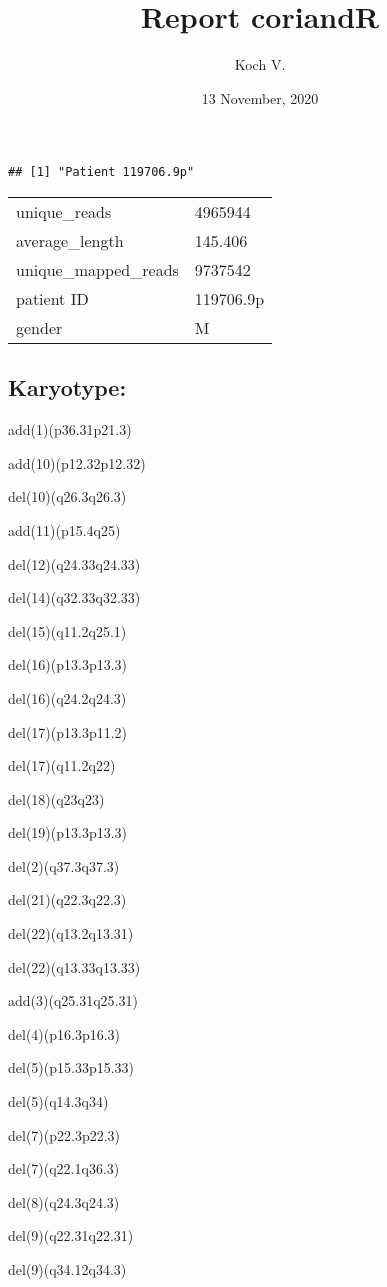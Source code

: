 \documentclass[]{article}
\title{Report coriandR}
\author{Koch V.}
\date{13 November, 2020}
\begin{document}
\maketitle

\begin{verbatim}
## [1] "Patient 119706.9p"
\end{verbatim}

\begin{longtable}[]{@{}ll@{}}
\toprule
\endhead
unique\_reads & 4965944\tabularnewline
average\_length & 145.406\tabularnewline
unique\_mapped\_reads & 9737542\tabularnewline
patient ID & 119706.9p\tabularnewline
gender & M\tabularnewline
\bottomrule
\end{longtable}

\hypertarget{karyotype}{%
\subsection{Karyotype:}\label{karyotype}}

add(1)(p36.31p21.3)

add(10)(p12.32p12.32)

del(10)(q26.3q26.3)

add(11)(p15.4q25)

del(12)(q24.33q24.33)

del(14)(q32.33q32.33)

del(15)(q11.2q25.1)

del(16)(p13.3p13.3)

del(16)(q24.2q24.3)

del(17)(p13.3p11.2)

del(17)(q11.2q22)

del(18)(q23q23)

del(19)(p13.3p13.3)

del(2)(q37.3q37.3)

del(21)(q22.3q22.3)

del(22)(q13.2q13.31)

del(22)(q13.33q13.33)

add(3)(q25.31q25.31)

del(4)(p16.3p16.3)

del(5)(p15.33p15.33)

del(5)(q14.3q34)

del(7)(p22.3p22.3)

del(7)(q22.1q36.3)

del(8)(q24.3q24.3)

del(9)(q22.31q22.31)

del(9)(q34.12q34.3)
\end{document}
